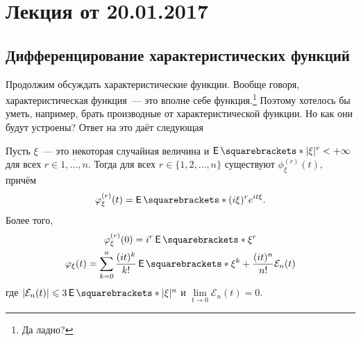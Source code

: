 \section{Лекция от 20.01.2017}
\subsection{Дифференцирование характеристических функций}
Продолжим обсуждать характеристические функции. Вообще говоря, 
характеристическая функция~--- это вполне себе функция.\footnote{Да ладно?} 
Поэтому хотелось бы уметь, например, брать производные от характеристической 
функции. Но как они будут устроены? Ответ на это даёт следующая
\begin{theorem}
	Пусть \(\xi\)~--- это некоторая случайная величина и \(\E{|\xi|^r} < 
	+\infty\) для всех \(r \in \overline{1,\ldots,n}\). Тогда для всех \(r \in 
	\{1, 2, \dots, n\}\) существуют \(\phi_{\xi}^{(r)}(t)\), причём
	\[
		\phi_{\xi}^{(r)}(t) = \E{(i\xi)^re^{it\xi}}.
	\]
	Более того,
	\begin{gather*}
		\phi_{\xi}^{(r)}(0) = i^r\E{\xi^r} \\
		\phi_{\xi}(t) = \sum_{k = 0}^{n} \frac{(it)^k}{k!}\E{\xi^k} + 
		\frac{(it)^n}{n!}\mathcal{E}_n(t)
	\end{gather*}
	где \(\left|\mathcal{E}_n(t)\right| \leq 3\E{|\xi|^n}\) и \(\lim\limits_{t 
	\to 0} \mathcal{E}_n(t) = 0\).
\end{theorem}
